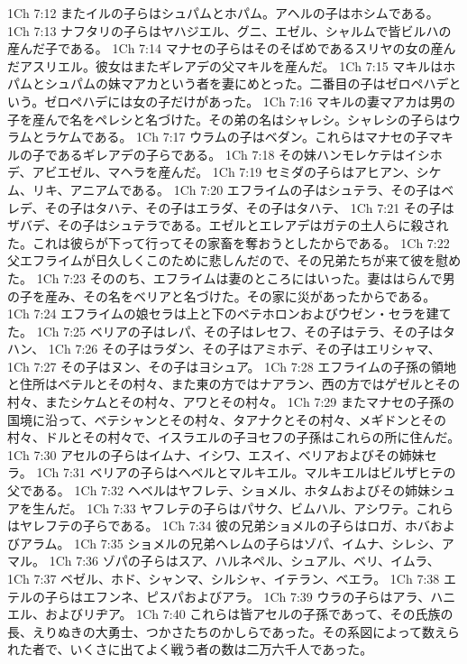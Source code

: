 1Ch 7:12  またイルの子らはシュパムとホパム。アヘルの子はホシムである。
1Ch 7:13  ナフタリの子らはヤハジエル、グニ、エゼル、シャルムで皆ビルハの産んだ子である。
1Ch 7:14  マナセの子らはそのそばめであるスリヤの女の産んだアスリエル。彼女はまたギレアデの父マキルを産んだ。
1Ch 7:15  マキルはホパムとシュパムの妹マアカという者を妻にめとった。二番目の子はゼロペハデという。ゼロペハデには女の子だけがあった。
1Ch 7:16  マキルの妻マアカは男の子を産んで名をペレシと名づけた。その弟の名はシャレシ。シャレシの子らはウラムとラケムである。
1Ch 7:17  ウラムの子はベダン。これらはマナセの子マキルの子であるギレアデの子らである。
1Ch 7:18  その妹ハンモレケテはイシホデ、アビエゼル、マヘラを産んだ。
1Ch 7:19  セミダの子らはアヒアン、シケム、リキ、アニアムである。
1Ch 7:20  エフライムの子はシュテラ、その子はベレデ、その子はタハテ、その子はエラダ、その子はタハテ、
1Ch 7:21  その子はザバデ、その子はシュテラである。エゼルとエレアデはガテの土人らに殺された。これは彼らが下って行ってその家畜を奪おうとしたからである。
1Ch 7:22  父エフライムが日久しくこのために悲しんだので、その兄弟たちが来て彼を慰めた。
1Ch 7:23  そののち、エフライムは妻のところにはいった。妻ははらんで男の子を産み、その名をベリアと名づけた。その家に災があったからである。
1Ch 7:24  エフライムの娘セラは上と下のベテホロンおよびウゼン・セラを建てた。
1Ch 7:25  ベリアの子はレパ、その子はレセフ、その子はテラ、その子はタハン、
1Ch 7:26  その子はラダン、その子はアミホデ、その子はエリシャマ、
1Ch 7:27  その子はヌン、その子はヨシュア。
1Ch 7:28  エフライムの子孫の領地と住所はベテルとその村々、また東の方ではナアラン、西の方ではゲゼルとその村々、またシケムとその村々、アワとその村々。
1Ch 7:29  またマナセの子孫の国境に沿って、ベテシャンとその村々、タアナクとその村々、メギドンとその村々、ドルとその村々で、イスラエルの子ヨセフの子孫はこれらの所に住んだ。
1Ch 7:30  アセルの子らはイムナ、イシワ、エスイ、ベリアおよびその姉妹セラ。
1Ch 7:31  ベリアの子らはヘベルとマルキエル。マルキエルはビルザヒテの父である。
1Ch 7:32  ヘベルはヤフレテ、ショメル、ホタムおよびその姉妹シュアを生んだ。
1Ch 7:33  ヤフレテの子らはパサク、ビムハル、アシワテ。これらはヤレフテの子らである。
1Ch 7:34  彼の兄弟ショメルの子らはロガ、ホバおよびアラム。
1Ch 7:35  ショメルの兄弟ヘレムの子らはゾパ、イムナ、シレシ、アマル。
1Ch 7:36  ゾパの子らはスア、ハルネペル、シュアル、ベリ、イムラ、
1Ch 7:37  ベゼル、ホド、シャンマ、シルシャ、イテラン、ベエラ。
1Ch 7:38  エテルの子らはエフンネ、ピスパおよびアラ。
1Ch 7:39  ウラの子らはアラ、ハニエル、およびリヂア。
1Ch 7:40  これらは皆アセルの子孫であって、その氏族の長、えりぬきの大勇士、つかさたちのかしらであった。その系図によって数えられた者で、いくさに出てよく戦う者の数は二万六千人であった。
